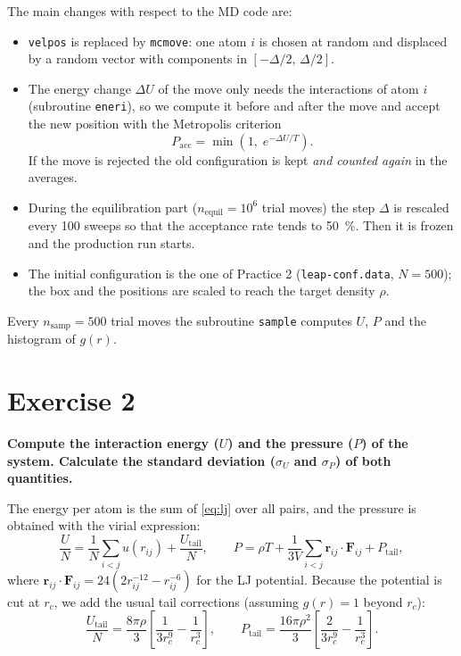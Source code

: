 \documentclass[a4paper,11pt]{article}
\newcommand{\exercise}[1]{\section*{Exercise #1}\addcontentsline{toc}{section}{Exercise #1}}
\newcommand{\statement}[1]{\textbf{#1}\par}
\begin{document}
The main changes with respect to the MD code are:
\begin{itemize}
  \item \texttt{velpos} is replaced by \texttt{mcmove}: one atom $i$ is chosen at random and displaced
        by a random vector with components in $[-\Delta/2,\,\Delta/2]$.
  \item The energy change $\Delta U$ of the move only needs the interactions of atom $i$
        (subroutine \texttt{eneri}), so we compute it before and after the move and accept the
        new position with the Metropolis criterion
        \begin{equation}
          P_{\text{acc}} = \min\left(1,\; e^{-\Delta U / T}\right).
          \label{eq:metropolis}
        \end{equation}
        If the move is rejected the old configuration is kept \emph{and counted again} in the averages.
  \item During the equilibration part ($n_{\text{equil}}=10^6$ trial moves) the step $\Delta$ is
        rescaled every 100 sweeps so that the acceptance rate tends to \SI{50}{\percent}. Then it is
        frozen and the production run starts.
  \item The initial configuration is the one of Practice 2 (\texttt{leap-conf.data}, $N=500$); the box
        and the positions are scaled to reach the target density $\rho$.
\end{itemize}

Every $n_{\text{samp}}=500$ trial moves the subroutine \texttt{sample} computes $U$, $P$ and the
histogram of $g(r)$.

\exercise{2}
\statement{Compute the interaction energy ($U$) and the pressure ($P$) of the system. Calculate the
standard deviation ($\sigma_U$ and $\sigma_P$) of both quantities.}

The energy per atom is the sum of \cref{eq:lj} over all pairs, and the pressure is obtained with the
virial expression:
\begin{equation}
  \frac{U}{N} = \frac{1}{N}\sum_{i<j} u(r_{ij}) + \frac{U_{\text{tail}}}{N},
  \qquad
  P = \rho T + \frac{1}{3V}\sum_{i<j} \mathbf{r}_{ij}\cdot\mathbf{F}_{ij} + P_{\text{tail}},
  \label{eq:UP}
\end{equation}
where $\mathbf{r}_{ij}\cdot\mathbf{F}_{ij} = 24\left(2r_{ij}^{-12}-r_{ij}^{-6}\right)$ for the LJ potential.
Because the potential is cut at $r_c$, we add the usual tail corrections (assuming $g(r)=1$ beyond $r_c$):
\begin{equation}
  \frac{U_{\text{tail}}}{N} = \frac{8\pi\rho}{3}\left[\frac{1}{3r_c^9}-\frac{1}{r_c^3}\right],
  \qquad
  P_{\text{tail}} = \frac{16\pi\rho^2}{3}\left[\frac{2}{3r_c^9}-\frac{1}{r_c^3}\right].
  \label{eq:tail}
\end{equation}
\end{document}
